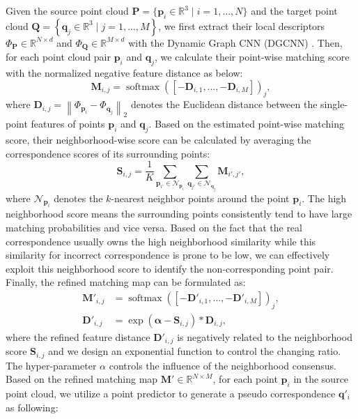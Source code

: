 \documentclass[letterpaper]{article} %
\begin{document}
	Given the source point cloud $\mathbf{P}=\{\mathbf{p}_i\in\mathbb{R}^3\mid i=1,...,N\}$ and the target point cloud $\mathbf{Q}=\left\{\mathbf{q}_j\in\mathbb{R}^3 \mid j=1,...,M\right\}$, we first extract their local descriptors ${\Phi}_{\mathbf{P}}\in\mathbb{R}^{N\times d}$ and ${\Phi}_{\mathbf{Q}}\in\mathbb{R}^{M\times d}$ with the Dynamic Graph CNN (DGCNN) \cite{wang2019dynamic}. Then, for each point cloud pair $\mathbf{p}_i$ and $\mathbf{q}_j$, we calculate their point-wise matching score with the normalized negative feature distance as below:
	\begin{equation}\label{M1}
	\mathbf{M}_{i,j}= \operatorname{softmax} \left(\left[-\mathbf{D}_{i,1},\ldots, -\mathbf{D}_{i,M}\right]\right)_{j},
	\end{equation}
	where $\mathbf{D}_{i,j} = \left\|{\Phi}_{\mathbf{p}_i} - {\Phi}_{\mathbf{q}_j}\right\|_2$ denotes the Euclidean distance between the single-point features of points $\mathbf{p}_i$ and $\mathbf{q}_j$.
	Based on the estimated point-wise matching score, their neighborhood-wise score can be calculated by averaging the correspondence scores of its surrounding points:
	\begin{equation}\label{eq1}
	\mathbf{S}_{i,j}= \frac{1}{K}\sum_{\mathbf{p}_{i'} \in \mathcal{N}_{\mathbf{p}_i}}\sum_{\mathbf{q}_{j'} \in \mathcal{N}_{\mathbf{q}_j}}\mathbf{M}_{i',j'},
	\end{equation}
	where $\mathcal{N}_{\mathbf{p}_i}$ denotes the $k$-nearest neighbor points around the point $\mathbf{p}_i$.
	The high neighborhood score means the surrounding points consistently tend to have large matching probabilities and vice versa.
	Based on the fact that the real correspondence usually owns the high neighborhood similarity while this similarity for incorrect correspondence is prone to be low,
	we can effectively exploit this neighborhood score to identify the non-corresponding point pair.
	Finally, the refined matching map can be formulated as:
	\begin{equation}\label{eq0}
	\begin{split}
	\mathbf{M}'_{i,j}&= \operatorname{softmax} \left(\left[-\mathbf{D}'_{i,1},\ldots, -\mathbf{D}'_{i,M}\right]\right)_{j},\\
	\mathbf{D}{'}_{i,j} &= \exp \left(\mathbf{\alpha} - \mathbf{S}_{i,j}\right) * \mathbf{D}_{i,j},
	\end{split}
	\end{equation}
	where the refined feature distance $\mathbf{D}'_{i,j}$ is negatively related to the neighborhood score  $\mathbf{S}_{i,j}$ and we design an exponential function to control the changing ratio. The hyper-parameter $\alpha$ controls the influence of the neighborhood consensus. Based on the refined matching map $\mathbf{M}' \in \mathbb{R}^{N \times M}$, for each point $\mathbf{p}_i$ in the source point cloud, we utilize a point predictor to generate a pseudo correspondence $\mathbf{q}'_i$ as following:
\end{document}
